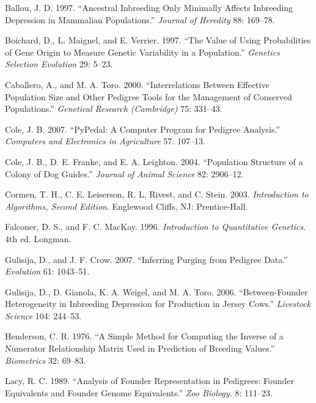 \documentclass[
  letterpaper,
  DIV=11,
  numbers=noendperiod]{scrreprt}
\newlength{\cslhangindent}
\newenvironment{CSLReferences}[2] %
 {\begin{list}{}{%
  \setlength{\itemindent}{0pt}
  \setlength{\leftmargin}{0pt}
  \setlength{\parsep}{0pt}
  \ifodd #1
   \setlength{\leftmargin}{\cslhangindent}
   \setlength{\itemindent}{-1\cslhangindent}
  \fi
  \setlength{\itemsep}{#2\baselineskip}}}
 {\end{list}}
\begin{document}
\label{refs}
\begin{CSLReferences}{1}{0}
Ballou, J. D. 1997. {``Ancestral Inbreeding Only Minimally Affects
Inbreeding Depression in Mammalian Populations.''} \emph{Journal of
Heredity} 88: 169--78.

Boichard, D., L. Maignel, and E. Verrier. 1997. {``The Value of Using
Probabilities of Gene Origin to Measure Genetic Variability in a
Population.''} \emph{Genetics Selection Evolution} 29: 5--23.

Caballero, A., and M. A. Toro. 2000. {``Interrelations Between Effective
Population Size and Other Pedigree Tools for the Management of Conserved
Populations.''} \emph{Genetical Research (Cambridge)} 75: 331--43.

Cole, J. B. 2007. {``{P}y{P}edal: A Computer Program for Pedigree
Analysis.''} \emph{Computers and Electronics in Agriculture} 57:
107--13.

Cole, J. B., D. E. Franke, and E. A. Leighton. 2004. {``Population
Structure of a Colony of Dog Guides.''} \emph{Journal of Animal Science}
82: 2906--12.

Cormen, T. H., C. E. Leiserson, R. L. Rivest, and C. Stein. 2003.
\emph{Introduction to Algorithms, Second Edition}. Englewood Cliffs, NJ:
Prentice-Hall.

Falconer, D. S., and F. C. MacKay. 1996. \emph{Introduction to
Quantitative Genetics}. 4th ed. Longman.

Gulisija, D., and J. F. Crow. 2007. {``Inferring Purging from Pedigree
Data.''} \emph{Evolution} 61: 1043--51.

Gulisija, D., D. Gianola, K. A. Weigel, and M. A. Toro. 2006.
{``Between-Founder Heterogeneity in Inbreeding Depression for Production
in {J}ersey Cows.''} \emph{Livestock Science} 104: 244--53.

Henderson, C. R. 1976. {``A Simple Method for Computing the Inverse of a
Numerator Relationship Matrix Used in Prediction of Breeding Values.''}
\emph{Biometrics} 32: 69--83.

Lacy, R. C. 1989. {``Analysis of Founder Representation in Pedigrees:
Founder Equivalents and Founder Genome Equivalents.''} \emph{Zoo
Biology.} 8: 111--23.


\end{CSLReferences}
\end{document}
